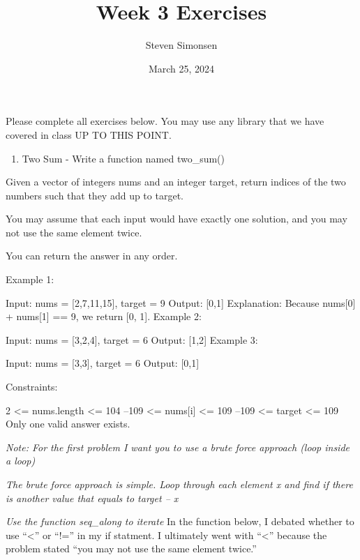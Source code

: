 \documentclass[
]{article}
\title{Week 3 Exercises}
\author{Steven Simonsen}
\date{March 25, 2024}
\providecommand{\tightlist}{%
  \setlength{\itemsep}{0pt}\setlength{\parskip}{0pt}}
\begin{document}
\maketitle

Please complete all exercises below. You may use any library that we
have covered in class UP TO THIS POINT.

\begin{enumerate}
\def\labelenumi{\arabic{enumi})}
\tightlist
\item
  Two Sum - Write a function named two\_sum()
\end{enumerate}

Given a vector of integers nums and an integer target, return indices of
the two numbers such that they add up to target.

You may assume that each input would have exactly one solution, and you
may not use the same element twice.

You can return the answer in any order.

Example 1:

Input: nums = {[}2,7,11,15{]}, target = 9 Output: {[}0,1{]} Explanation:
Because nums{[}0{]} + nums{[}1{]} == 9, we return {[}0, 1{]}. Example 2:

Input: nums = {[}3,2,4{]}, target = 6 Output: {[}1,2{]} Example 3:

Input: nums = {[}3,3{]}, target = 6 Output: {[}0,1{]}

Constraints:

2 \textless= nums.length \textless= 104 --109 \textless= nums{[}i{]}
\textless= 109 --109 \textless= target \textless= 109 Only one valid
answer exists.

\emph{Note: For the first problem I want you to use a brute force
approach (loop inside a loop)}

\emph{The brute force approach is simple. Loop through each element x
and find if there is another value that equals to target -- x}

\emph{Use the function seq\_along to iterate} In the function below, I
debated whether to use ``\textless{}'' or ``!='' in my if statment. I
ultimately went with ``\textless{}'' because the problem stated ``you
may not use the same element twice.''
\end{document}

